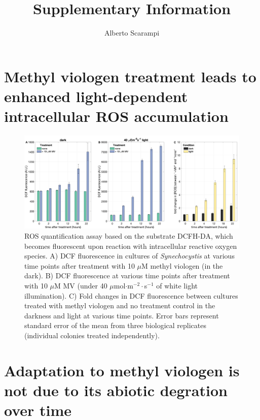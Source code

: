 \documentclass[12pt]{article}
\title{\textbf{Supplementary Information} 
}
\author{Alberto Scarampi}
\date{}
\begin{document}
\maketitle

\tableofcontents



\section{Methyl viologen treatment leads to enhanced light-dependent intracellular ROS accumulation}


\begin{figure}[H]
    \centering
    \includegraphics[width=\hsize]{../Figures/MV_adaptation/MV_ROS_DFCDA_Syn6803.png}
    \caption{ROS quantification assay based on the substrate DCFH-DA, which becomes fluorescent upon reaction with intracellular reactive oxygen species. A) DCF fluorescence in cultures of \textit{Synechocystis} at various time points after treatment with 10 $\mu$M methyl viologen (in the dark). B) DCF fluorescence at various time points after treatment with 10 $\mu$M MV (under 40 $\mu$mol$\cdot$m$^{-2}\cdot$s$^{-1}$ of white light illumination). C) Fold changes in DCF fluorescence between cultures treated with methyl viologen and no treatment control in the darkness and light at various time points. Error bars represent standard error of the mean from three biological replicates (individual colonies treated independently).}
    \label{fig:spectraMV1}
\end{figure}

\section{Adaptation to methyl viologen is not due to its abiotic degration over time}
\end{document}
